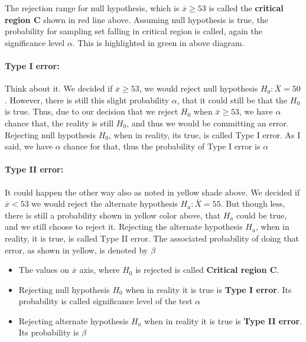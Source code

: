 \documentclass[float=false,crop=false]{standalone}
\begin{document}
    The rejection range for null hypothesis, which is
\(\overline{x} \geq 53\) is called the \textbf{critical region C} shown
in red line above. Assuming null hypothesis is true, the probability for
sampling set falling in critical region is called, again the
significance level \(\alpha\). This is highlighted in green in above
diagram.

\paragraph{Type I error:}\label{type-i-error}

Think about it. We decided if \(\overline{x} \geq 53\), we would reject
null hypothesis \(H_0:\overline{X} = 50\). However, there is still this
slight probability \(\alpha\), that it could still be that the \(H_0\)
is true. Thus, due to our decision that we reject \(H_0\) when
\(\overline{x} \geq 53\), we have \(\alpha\) chance that, the reality is
still \(H_0\), and thus we would be committing an error. Rejecting null
hypothesis \(H_0\), when in reality, its true, is called Type I error.
As I said, we have \(\alpha\) chance for that, thus the probability of
Type I error is \(\alpha\)

\paragraph{Type II error:}\label{type-ii-error}

It could happen the other way also as noted in yellow shade above. We
decided if \(\overline{x} < 53\) we would reject the alternate
hypothesis \(H_a: \overline{X} = 55\). But though less, there is still a
probability shown in yellow color above, that \(H_a\) could be true, and
we still choose to reject it. Rejecting the alternate hypothesis
\(H_a\), when in reality, it is true, is called Type II error. The
associated probability of doing that error, as shown in yellow, is
denoted by \(\beta\)
\begin{tcolorbox}[colback=green!5,colframe=green!40!black,title={Critical region, Type I and II errors}]
\begin{itemize}
\item The values on $\overline{x}$ axis, where $H_0$ is rejected is called \textbf{Critical region C}. 
\item Rejecting null hypothesis $H_0$ when in reality it is true is \textbf{Type I error}. Its probability is called significance level of the test $\alpha$
\item Rejecting alternate hypothesis $H_a$ when in reality it is true is \textbf{Type II error}. Its probability is $\beta$
\end{itemize}
\end{tcolorbox}
\end{document}
